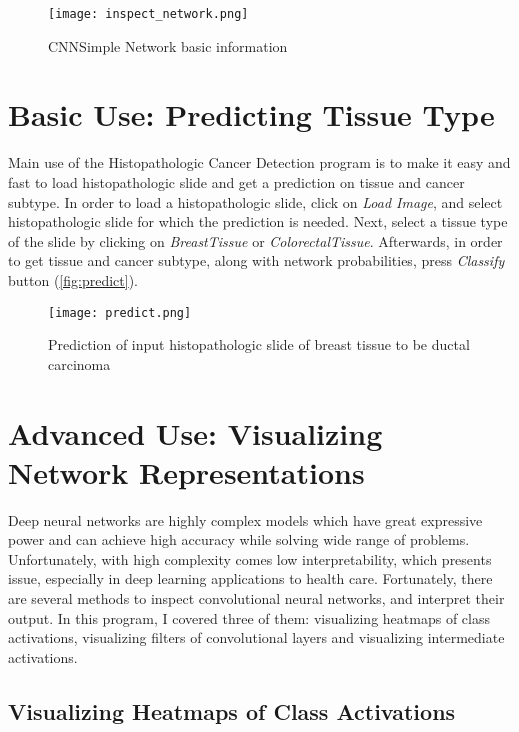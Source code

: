 \begin{figure}[h]
	\centering
	\texttt{[image: inspect\_network.png]}
	\caption{CNNSimple Network basic information}
	\label{fig:inspectdataset}
\end{figure}

\section{Basic Use: Predicting Tissue Type}

Main use of the Histopathologic Cancer Detection program is to make it easy and fast to load histopathologic slide and get a prediction on tissue and cancer subtype. In order to load a histopathologic slide, click on \emph{Load\; Image}, and select histopathologic slide for which the prediction is needed. Next, select a tissue type of the slide by clicking on \emph{Breast\;Tissue} or \emph{Colorectal\;Tissue}. Afterwards, in order to get tissue and cancer subtype, along with network probabilities, press \emph{Classify} button (\textcolor{red}{\autoref{fig:predict}}).

\begin{figure}[h]
	\centering
	\texttt{[image: predict.png]}
	\caption{Prediction of input histopathologic slide of breast tissue to be ductal carcinoma}
	\label{fig:predict}
\end{figure}

\section{Advanced Use: Visualizing Network Representations}

Deep neural networks are highly complex models which have great expressive power and can achieve high accuracy while solving wide range of problems. Unfortunately, with high complexity comes low interpretability, which presents issue, especially in deep learning applications to health care. Fortunately, there are several methods to inspect convolutional neural networks, and interpret their output. In this program, I covered three of them: visualizing heatmaps of class activations, visualizing filters of convolutional layers and visualizing intermediate activations.

\subsection{Visualizing Heatmaps of Class Activations}

